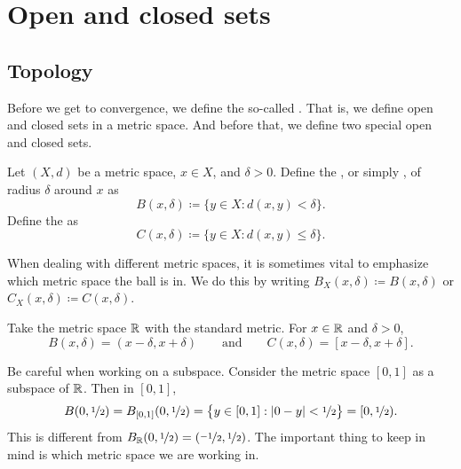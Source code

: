 \sectionnewpage
\section{Open and closed sets}
\label{sec:mettop}


\subsection{Topology}

Before we get to convergence,
we define the so-called \emph{}.
That is,
we define open and closed sets in a metric space.
And before that,
we define two special open and closed sets.

\begin{defn}
Let $(X,d)$ be a metric space, $x \in X$, and $\delta > 0$.  Define
the \emph{}, or simply \emph{}, of radius $\delta$
around $x$ as
\begin{equation*}
B(x,\delta) \coloneqq \bigl\{ y \in X : d(x,y) < \delta \bigr\} .
\end{equation*}
Define the \emph{} as
\begin{equation*}
C(x,\delta) \coloneqq \bigl\{ y \in X : d(x,y) \leq \delta \bigr\} .
\end{equation*}
\end{defn}

When dealing with different metric spaces, it is sometimes 
vital to emphasize which metric space the ball is in.  We do this by
writing $B_X(x,\delta) \coloneqq B(x,\delta)$ or $C_X(x,\delta) \coloneqq C(x,\delta)$.

\begin{example}
Take the metric space ${\mathbb{R}}$ with the standard metric.  For
$x \in {\mathbb{R}}$ and $\delta > 0$,
\begin{equation*}
B(x,\delta) = (x-\delta,x+\delta) \qquad \text{and} \qquad
C(x,\delta) = [x-\delta,x+\delta] .
\end{equation*}
\end{example}

\begin{example}
Be careful when working on a subspace.  Consider the
metric space $[0,1]$ as a subspace of ${\mathbb{R}}$.  Then in $[0,1]$,
\begin{equation*}
B(0,\nicefrac{1}{2}) = B_{[0,1]}(0,\nicefrac{1}{2})
= \bigl\{ y \in [0,1] : \left\lvert {0-y} \right\rvert < \nicefrac{1}{2} \bigr\}
= [0,\nicefrac{1}{2}) .
\end{equation*}
This is different from $B_{{\mathbb{R}}}(0,\nicefrac{1}{2}) =
(\nicefrac{-1}{2},\nicefrac{1}{2})$.
The important thing to keep in mind is which metric space we are working
in.
\end{example}

